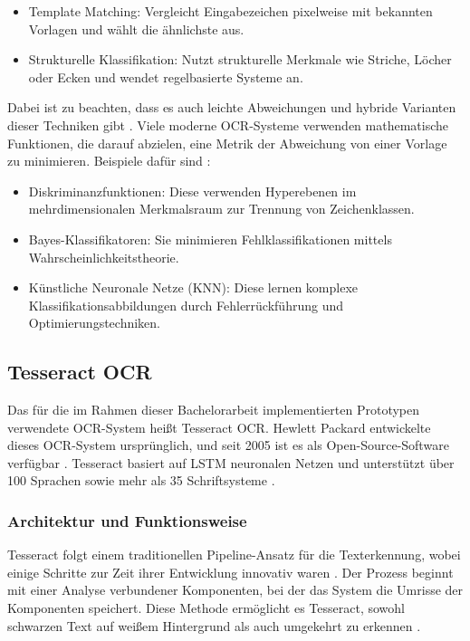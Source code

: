 \begin{itemize}
	\item Template Matching: Vergleicht Eingabezeichen pixelweise mit bekannten Vorlagen und wählt die ähnlichste aus.
	\item Strukturelle Klassifikation: Nutzt strukturelle Merkmale wie Striche, Löcher oder Ecken und wendet regelbasierte Systeme an.
\end{itemize}

Dabei ist zu beachten, dass es auch leichte Abweichungen und hybride Varianten dieser Techniken gibt \parencite{BorovikovEugene2014Asom}. Viele moderne \gls{OCR}-Systeme verwenden mathematische Funktionen, die darauf abzielen, eine Metrik der Abweichung von einer Vorlage zu minimieren. Beispiele dafür sind \parencite{BorovikovEugene2014Asom}:

\begin{itemize}
	\item Diskriminanzfunktionen: Diese verwenden Hyperebenen im mehrdimensionalen Merkmalsraum zur Trennung von Zeichenklassen.
	\item Bayes-Klassifikatoren: Sie minimieren Fehlklassifikationen mittels Wahrscheinlichkeitstheorie.
	\item Künstliche Neuronale Netze (KNN): Diese lernen komplexe Klassifikationsabbildungen durch Fehlerrückführung und Optimierungstechniken.
\end{itemize}

\subsection{Tesseract OCR}
\label{subsec:tesseract-ocr}

Das für die im Rahmen dieser Bachelorarbeit implementierten Prototypen verwendete \gls{OCR}-System heißt Tesseract \gls{OCR}. Hewlett Packard entwickelte dieses \gls{OCR}-System ursprünglich, und seit 2005 ist es als Open-Source-Software verfügbar \parencite{SmithR_2007_AOot}. Tesseract basiert auf \gls{LSTM} neuronalen Netzen und unterstützt über 100 Sprachen sowie mehr als 35 Schriftsysteme \parencite{tesseract_ocr_user_manual}. 

\subsubsection{Architektur und Funktionsweise}
\label{subsubsec:architektur-und-funktionsweise}

Tesseract folgt einem traditionellen Pipeline-Ansatz für die Texterkennung, wobei einige Schritte zur Zeit ihrer Entwicklung innovativ waren \parencite{SmithR_2007_AOot}. Der Prozess beginnt mit einer Analyse verbundener Komponenten, bei der das System die Umrisse der Komponenten speichert. Diese Methode ermöglicht es Tesseract, sowohl schwarzen Text auf weißem Hintergrund als auch umgekehrt zu erkennen \parencite{SmithR_2007_AOot}.

